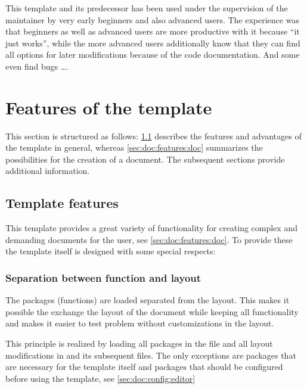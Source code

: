 This template and its predecessor has been used under the supervision of the maintainer by very early beginners and also advanced \latex users. The experience was that beginners as well as advanced users are more productive with it because \enquote{it just works}, while the more advanced users additionally know that they can find all options for later modifications because of the code documentation. And some even find bugs \ldots.

\section{Features of the template}
\label{sec:doc:features}

This section is structured as follows: \cref{sec:doc:features:template} describes the features and advantages of the template in general, whereas \cref{sec:doc:features:doc} summarizes the possibilities for the creation of a document. The subsequent sections provide additional information.

\subsection{Template features}
\label{sec:doc:features:template}
This template provides a great variety of functionality for creating complex and demanding documents for the user, see \cref{sec:doc:features:doc}. To provide these the template itself is designed with some special respects:

\subsubsection{Separation between function and layout}
\label{sec:doc:features:template:sep}
The packages (functions) are loaded separated from the layout. This makes it possible the exchange the layout of the document while keeping all functionality and makes it easier to test problem without customizations in the layout.

This principle is realized by loading all packages in the file  and all layout modifications in  and its subsequent files. The only exceptions are packages that are necessary for the template itself and packages that should be configured before using the template, see \cref{sec:doc:config:editor}
%
